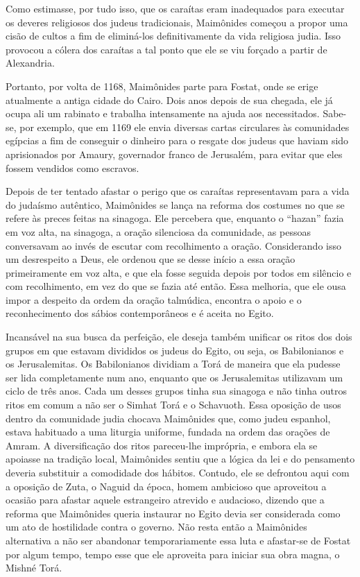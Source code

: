 Como estimasse, por tudo isso, que os caraítas eram inadequados para
executar os deveres religiosos dos judeus tradicionais, Maimônides
começou a propor uma cisão de cultos a fim de eliminá-los
definitivamente da vida religiosa judia. Isso provocou a cólera dos
caraítas a tal ponto que ele se viu forçado a partir de Alexandria.

Portanto, por volta de 1168, Maimônides parte para Fostat, onde se erige
atualmente a antiga cidade do Cairo. Dois anos depois de sua chegada,
ele já ocupa ali um rabinato e trabalha intensamente na ajuda aos
necessitados. Sabe-se, por exemplo, que em 1169 ele envia diversas
cartas circulares às comunidades egípcias a fim de conseguir o dinheiro
para o resgate dos judeus que haviam sido aprisionados por Amaury,
governador franco de Jerusalém, para evitar que eles fossem vendidos
como escravos.

Depois de ter tentado afastar o perigo que os caraítas representavam
para a vida do judaísmo autêntico, Maimônides se lança na reforma dos
costumes no que se refere às preces feitas na sinagoga. Ele percebera
que, enquanto o ``hazan'' fazia em voz alta, na sinagoga, a oração
silenciosa da comunidade, as pessoas conversavam ao invés de escutar com
recolhimento a oração. Considerando isso um desrespeito a Deus, ele
ordenou que se desse início a essa oração primeiramente em voz alta, e
que ela fosse seguida depois por todos em silêncio e com recolhimento,
em vez do que se fazia até então. Essa melhoria, que ele ousa impor a
despeito da ordem da oração talmúdica, encontra o apoio e o
reconhecimento dos sábios contemporâneos e é aceita no Egito.

Incansável na sua busca da perfeição, ele deseja também unificar os
ritos dos dois grupos em que estavam divididos os judeus do Egito, ou
seja, os Babilonianos e os Jerusalemitas. Os Babilonianos dividiam a
Torá de maneira que ela pudesse ser lida completamente num ano,
enquanto que os Jerusalemitas utilizavam um ciclo de três anos. Cada um
desses grupos tinha sua sinagoga e não tinha outros ritos em comum a
não ser o Simhat Torá e o Schavuoth. Essa oposição de usos dentro da
comunidade judia chocava Maimônides que, como judeu espanhol, estava
habituado a uma liturgia uniforme, fundada na ordem das orações de
Amram. A diversificação dos ritos pareceu-lhe imprópria, e embora ela se
apoiasse na tradição local, Maimônides sentiu que a lógica da lei e do
pensamento deveria substituir a comodidade dos hábitos. Contudo, ele se
defrontou aqui com a oposição de Zuta, o Naguid da época, homem
ambicioso que aproveitou a ocasião para afastar aquele estrangeiro
atrevido e audacioso, dizendo que a reforma que Maimônides queria
instaurar no Egito devia ser considerada como um ato de hostilidade
contra o governo. Não resta então a Maimônides alternativa a não ser
abandonar temporariamente essa luta e afastar-se de Fostat por algum
tempo, tempo esse que ele aproveita para iniciar sua obra magna, o
Mishné Torá.

